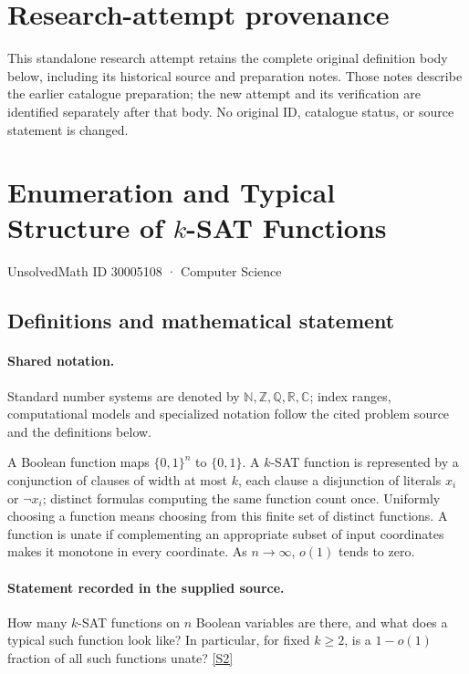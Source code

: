 \documentclass[11pt]{article}
\begin{document}
\section*{Research-attempt provenance}
This standalone research attempt retains the complete original definition body below,
including its historical source and preparation notes. Those notes describe the
earlier catalogue preparation; the new attempt and its verification are identified
separately after that body. No original ID, catalogue status, or source statement is changed.

\section{Enumeration and Typical Structure of $k$-SAT Functions}\label{30005108}
{\small UnsolvedMath ID 30005108 · Computer Science}
\subsection{Definitions and mathematical statement}

\paragraph{Shared notation.}Standard number systems are denoted by $\mathbb N,\mathbb Z,\mathbb Q,\mathbb R,\mathbb C$; index ranges, computational models and specialized notation follow the cited problem source and the definitions below.


A Boolean function maps $\{0,1\}^n$ to $\{0,1\}$. A $k$-SAT function is represented by a conjunction of clauses of width at most $k$, each clause a disjunction of literals $x_i$ or $\neg x_i$; distinct formulas computing the same function count once. Uniformly choosing a function means choosing from this finite set of distinct functions. A function is unate if complementing an appropriate subset of input coordinates makes it monotone in every coordinate. As $n\to\infty$, $o(1)$ tends to zero.
\paragraph{Statement recorded in the supplied source.}
How many $k$-SAT functions on $n$ Boolean variables are there, and what does a typical such function look like? In particular, for fixed $k\geq 2$, is a $1-o(1)$ fraction of all such functions unate? \href{https://doi.org/10.4171/owr/2022/22}{[S2]}
\end{document}
